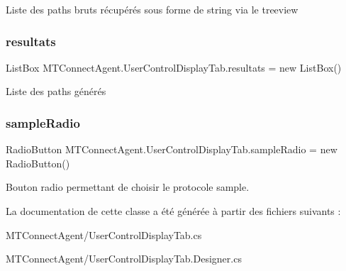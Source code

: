 Liste des paths bruts récupérés sous forme de string via le treeview 

\mbox{\label{class_m_t_connect_agent_1_1_user_control_display_tab_a083da92870ac6aad4307ae14a32bc561}} 
\subsubsection{\texorpdfstring{resultats}{resultats}}
{\footnotesize\ttfamily List\+Box M\+T\+Connect\+Agent.\+User\+Control\+Display\+Tab.\+resultats = new List\+Box()\hspace{0.3cm}{\ttfamily [private]}}



Liste des paths générés 

\mbox{\label{class_m_t_connect_agent_1_1_user_control_display_tab_afd8149a27f0eca9e61e12880fce8bdc9}} 
\subsubsection{\texorpdfstring{sample\+Radio}{sampleRadio}}
{\footnotesize\ttfamily Radio\+Button M\+T\+Connect\+Agent.\+User\+Control\+Display\+Tab.\+sample\+Radio = new Radio\+Button()\hspace{0.3cm}{\ttfamily [private]}}



Bouton radio permettant de choisir le protocole sample. 



La documentation de cette classe a été générée à partir des fichiers suivants \+:\begin{DoxyCompactItemize}
\item 
M\+T\+Connect\+Agent/User\+Control\+Display\+Tab.\+cs\item 
M\+T\+Connect\+Agent/User\+Control\+Display\+Tab.\+Designer.\+cs\end{DoxyCompactItemize}

